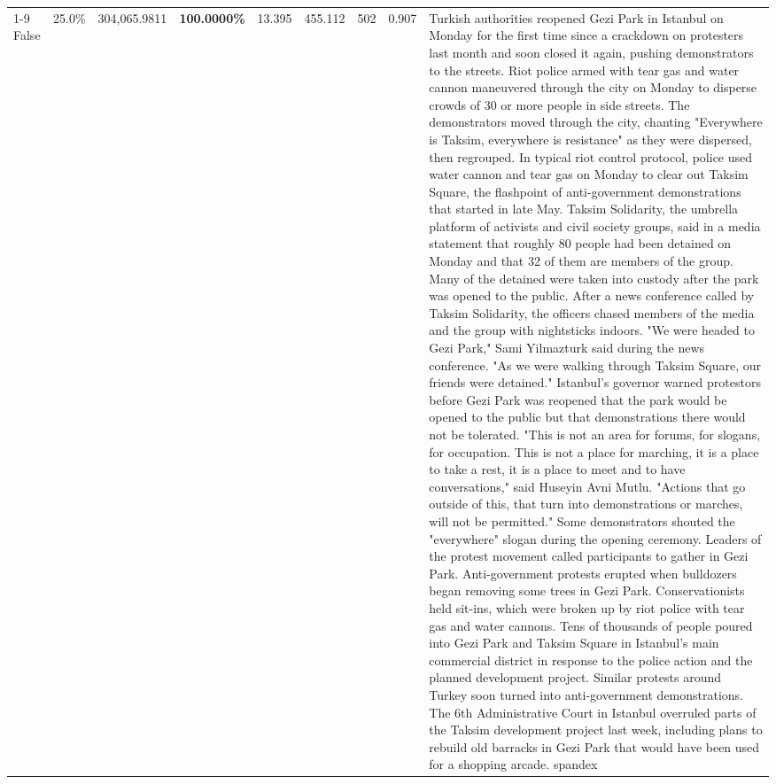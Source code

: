 \begin{table}[H]
\begin{tabular}{lllrlllll}
\cline{1-9}
False & 25.0\% & \color{red} 304,065.9811 & \bfseries \color{red} 100.0000\% & 13.395 & 455.112 & 502 & 0.907 & Turkish authorities reopened Gezi Park in Istanbul on Monday for the first time since a crackdown on protesters last month and soon closed it again, pushing demonstrators to the streets. Riot police armed with tear gas and water cannon maneuvered through the city on Monday to disperse crowds of 30 or more people in side streets. The demonstrators moved through the city, chanting "Everywhere is Taksim, everywhere is resistance" as they were dispersed, then regrouped. In typical riot control protocol, police used water cannon and tear gas on Monday to clear out Taksim Square, the flashpoint of anti-government demonstrations that started in late May. Taksim Solidarity, the umbrella platform of activists and civil society groups, said in a media statement that roughly 80 people had been detained on Monday and that 32 of them are members of the group. Many of the detained were taken into custody after the park was opened to the public. After a news conference called by Taksim Solidarity, the officers chased members of the media and the group with nightsticks indoors. "We were headed to Gezi Park," Sami Yilmazturk said during the news conference. "As we were walking through Taksim Square, our friends were detained." Istanbul's governor warned protestors before Gezi Park was reopened that the park would be opened to the public but that demonstrations there would not be tolerated. "This is not an area for forums, for slogans, for occupation. This is not a place for marching, it is a place to take a rest, it is a place to meet and to have conversations," said Huseyin Avni Mutlu. "Actions that go outside of this, that turn into demonstrations or marches, will not be permitted." Some demonstrators shouted the "everywhere" slogan during the opening ceremony. Leaders of the protest movement called participants to gather in Gezi Park. Anti-government protests erupted when bulldozers began removing some trees in Gezi Park. Conservationists held sit-ins, which were broken up by riot police with tear gas and water cannons. Tens of thousands of people poured into Gezi Park and Taksim Square in Istanbul's main commercial district in response to the police action and the planned development project. Similar protests around Turkey soon turned into anti-government demonstrations. The 6th Administrative Court in Istanbul overruled parts of the Taksim development project last week, including plans to rebuild old barracks in Gezi Park that would have been used for a shopping arcade. spandex \\

\end{tabular}
\end{table}
